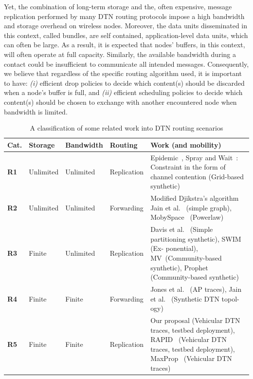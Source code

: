 Yet, the combination of long-term storage and the, often expensive, message replication performed by many DTN routing protocols impose a high bandwidth and storage overhead on wireless nodes. Moreover, the data units disseminated in this context, called bundles, are self contained, application-level data units, which can often be large. As a result, it is expected that nodes' buffers, in this context, will often operate at full capacity. Similarly, the available bandwidth during a contact could be insufficient to communicate all intended messages. Consequently, we believe that regardless of the specific routing algorithm used, it is important to have: \emph{(i)} efficient drop policies to decide which content(s) should be discarded when a node's buffer is full, and \emph{(ii)} efficient scheduling policies to decide which content(s) should be chosen to exchange with another encountered node when bandwidth is limited. 
\begin{table}[!h]
\renewcommand{\arraystretch}{1.1}
\caption{A classification of some related work into DTN routing scenarios}
\centering
\footnotesize
\begin{tabular}{|p{1cm}|p{1.5cm}|p{1.7cm}|p{1.5cm}|p{5cm}|}
\hline
\bfseries Cat. &\bfseries Storage &\bfseries Bandwidth  &\bfseries Routing& \bfseries Work (and mobility)\\
\hline
\bfseries R1&Unlimited & Unlimited &Replication & Epidemic~\cite{Vahdat:epidemic}, Spray and Wait~\cite{akis:wdtn}: Constraint in the form of
channel contention (Grid-based synthetic)\\
\hline
\bfseries R2&Unlimited & Unlimited &Forwarding & Modified Djikstra's algorithm Jain et al.~\cite{Fall:DTNrouting} (simple graph),
MobySpace~\cite{DTNSpace} (Powerlaw)\\
\hline
\bfseries R3&Finite & Unlimited &Replication &Davis et al.~\cite{Wearable} (Simple partitioning synthetic), SWIM~\cite{Haas:wdtn} (Ex-
ponential), MV~\cite{MVRouting}(Community-based synthetic), Prophet~\cite{prophet03}
(Community-based synthetic) \\
\hline
\bfseries R4&Finite & Finite & Forwarding& Jones et al.~\cite{Waterloo:wdtn} (AP traces), Jain et al.~\cite{Fall:DTNrouting} (Synthetic DTN topol-
ogy)\\
\hline
\bfseries R5&Finite & Finite &Replication & Our proposal (Vehicular DTN traces, testbed deployment), RAPID~\cite{Levine:Sigcomm07} (Vehicular DTN traces, testbed deployment), MaxProp~\cite{Levine:MaxProp} (Vehicular DTN traces) \\
\hline
\end{tabular}
\label{RoutingSummary}
\end{table}

